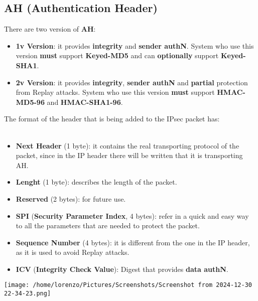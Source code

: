 \subsection{AH (Authentication Header)}
There are two version of \textbf{AH}:
\begin{itemize}
    \item \textbf{1v Version}: it provides \textbf{integrity} and \textbf{sender authN}. System who use this version
    \textbf{must} support \textbf{Keyed-MD5} and can \textbf{optionally} support \textbf{Keyed-SHA1}.
    \item \textbf{2v Version}: it provides \textbf{integrity}, \textbf{sender authN} and \textbf{partial} protection from Replay
    attacks. System who use this version \textbf{must} support \textbf{HMAC-MD5-96} and \textbf{HMAC-SHA1-96}.
\end{itemize}
The format of the header that is being added to the IPsec packet has:
\\    
\\
\begin{minipage}{0.6\textwidth}
    \begin{itemize}
        \item \textbf{Next Header} (1 byte): it contains the real transporting protocol of the packet, since in the IP header there will be written that it is transporting AH.
        \item \textbf{Lenght} (1 byte): describes the length of the packet.
        \item \textbf{Reserved} (2 bytes): for future use.
        \item \textbf{SPI} (\textbf{Security Parameter Index}, 4 bytes): refer in a quick and easy way to all the parameters that are needed to protect the packet.
        \item \textbf{Sequence Number} (4 bytes): it is different from the one in the IP header, as it is used to avoid Replay attacks.
        \item \textbf{ICV} (\textbf{Integrity Check Value}): Digest that provides \textbf{data authN}.
    \end{itemize}
\end{minipage} 
\hspace{0.3cm}
\begin{minipage}{0.4\textwidth}
    \centering
    \texttt{[image: /home/lorenzo/Pictures/Screenshots/Screenshot from 2024-12-30 22-34-23.png]}
\end{minipage}
